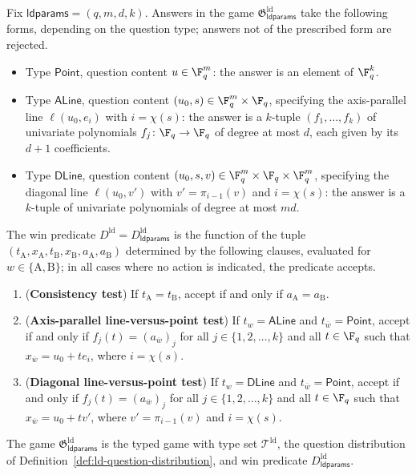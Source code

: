 \begin{definition}\label{def:ld-win-predicate}
	Fix $\mathsf{ldparams} = (q,m,d,k)$. Answers in the game $\mathfrak{G}^{\mathrm{ld}}_{\mathsf{ldparams}}$ take the following forms, depending on the question type; answers not of the prescribed form are rejected.
	\begin{itemize}
		\item Type $\mathsf{Point}$, question content $u \in \F_q^m$: the answer is an element of $\F_q^k$.
		\item Type $\mathsf{ALine}$, question content $(u_0,s) \in \F_q^m \times \F_q$, specifying the axis-parallel line $\ell(u_0,e_i)$ with $i = \chi(s)$: the answer is a $k$-tuple $(f_1,\ldots,f_k)$ of univariate polynomials $f_j\colon \F_q \to \F_q$ of degree at most $d$, each given by its $d+1$ coefficients.
		\item Type $\mathsf{DLine}$, question content $(u_0,s,v) \in \F_q^m \times \F_q \times \F_q^m$, specifying the diagonal line $\ell(u_0,v')$ with $v' = \pi_{i-1}(v)$ and $i = \chi(s)$: the answer is a $k$-tuple of univariate polynomials of degree at most $md$.
	\end{itemize}
	The win predicate $D^{\mathrm{ld}} = D^{\mathrm{ld}}_{\mathsf{ldparams}}$ is the function of the tuple $(t_{\mathrm A}, x_{\mathrm A}, t_{\mathrm B}, x_{\mathrm B}, a_{\mathrm A}, a_{\mathrm B})$ determined by the following clauses, evaluated for $w \in \{\mathrm A,\mathrm B\}$; in all cases where no action is indicated, the predicate accepts.
	\begin{enumerate}
		\item (\textbf{Consistency test}) If $t_{\mathrm A} = t_{\mathrm B}$, accept if and only if $a_{\mathrm A} = a_{\mathrm B}$.
		\item (\textbf{Axis-parallel line-versus-point test}) If $t_w = \mathsf{ALine}$ and $t_{\overline w} = \mathsf{Point}$, accept if and only if $f_j(t) = (a_{\overline w})_j$ for all $j \in \{1,2,\ldots,k\}$ and all $t \in \F_q$ such that $x_{\overline w} = u_0 + t e_i$, where $i = \chi(s)$.
		\item (\textbf{Diagonal line-versus-point test}) If $t_w = \mathsf{DLine}$ and $t_{\overline w} = \mathsf{Point}$, accept if and only if $f_j(t) = (a_{\overline w})_j$ for all $j \in \{1,2,\ldots,k\}$ and all $t \in \F_q$ such that $x_{\overline w} = u_0 + t v'$, where $v' = \pi_{i-1}(v)$ and $i = \chi(s)$.
	\end{enumerate}
	The game $\mathfrak{G}^{\mathrm{ld}}_{\mathsf{ldparams}}$ is the typed game with type set $\mathcal T^{\mathrm{ld}}$, the question distribution of Definition~\ref{def:ld-question-distribution}, and win predicate $D^{\mathrm{ld}}_{\mathsf{ldparams}}$.
\end{definition}

